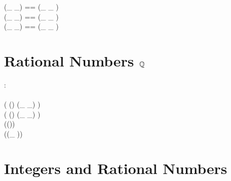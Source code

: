 \documentclass[12pt]{scrartcl}
\begin{document}
\begin{zed}
  (\_ \aleq \_) == (\_ \alt \_ ) \cup \id \real \\
  (\_ \agt \_) == (\_ \alt \_ ) \inv \\
  (\_ \ageq \_) == (\_ \agt \_ ) \cup \id \real \\
\end{zed}

\section{Rational Numbers $\mathbb{Q}$}
\label{sec:rational-numbers}

\begin{axdef}
  \rat : \power \real
  \where
  \azero \in \rat\\
  \aone \in \rat\\
  \ran ( (\rat \cross \rat) \dres (\_ \aplus \_) ) \subset \rat\\
  \ran ( (\rat \cross \rat) \dres (\_ \amult \_) ) \subset \rat\\
  \ran (\rat \dres (\aneg ))  \subset \rat\\
  \ran (\rat \dres (\_ \ainv ))  \subset \rat\\
\end{axdef}

\section{Integers and Rational Numbers}
\label{sec:integers-and-rationals}




% 
\printbibliography{}

\end{document}
